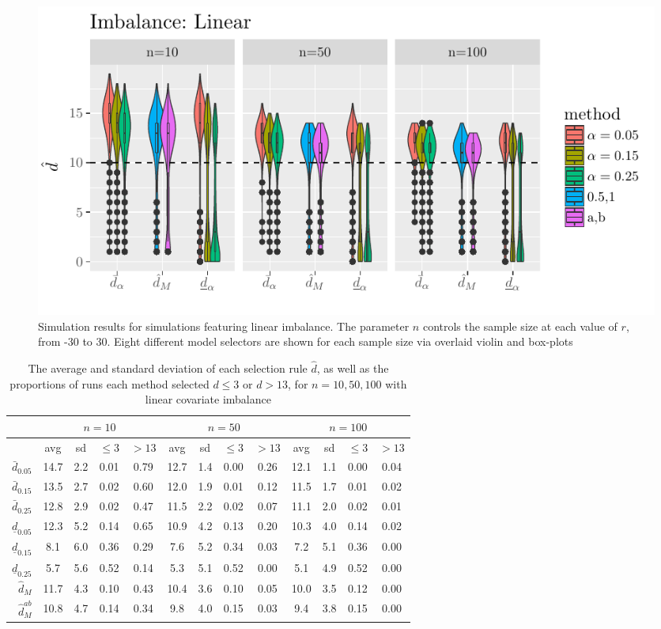 \documentclass[lineno]{biometrika}\usepackage[]{graphicx}\usepackage[]{color}
\makeatletter
\def\maxwidth{ %
  \ifdim\Gin@nat@width>\linewidth
    \linewidth
  \else
    \Gin@nat@width
  \fi
}
\newcommand{\dhatU}{\bar{d}}
\newcommand{\dhatB}{\underline{d}}
\newcommand{\dhatm}{\hat{d}_M}
\newcommand{\dhatmab}{\hat{d}^{ab}_M}
\makeatother
\begin{document}
\begin{figure}

\includegraphics[width=\maxwidth]{figure/linearImbalance-1}

\caption{Simulation results for simulations featuring linear
  imbalance. The parameter $n$ controls the sample size at each value
  of $r$, from -30 to 30. Eight different model selectors are shown
  for each sample size via overlaid violin and box-plots}
\label{fig:linImb}
\end{figure}


\begin{table}[ht]
\centering
\begin{tabular}{r|cccc|cccc|cccc|}
  & \multicolumn{4}{c}{$n=10$}&\multicolumn{4}{c}{$n=50$} &\multicolumn{4}{c}{$n=100$}\\
 \hline
 & avg & sd & $\le 3$ & $>13$ & avg & sd & $\le 3$ & $>13$ & avg & sd & $\le 3$ & $>13$ \\
  \hline
$\dhatU_{0.05}$ & 14.7 & 2.2 & 0.01 & 0.79 & 12.7 & 1.4 & 0.00 & 0.26 & 12.1 & 1.1 & 0.00 & 0.04 \\
  $\dhatU_{0.15}$ & 13.5 & 2.7 & 0.02 & 0.60 & 12.0 & 1.9 & 0.01 & 0.12 & 11.5 & 1.7 & 0.01 & 0.02 \\
  $\dhatU_{0.25}$ & 12.8 & 2.9 & 0.02 & 0.47 & 11.5 & 2.2 & 0.02 & 0.07 & 11.1 & 2.0 & 0.02 & 0.01 \\
  $\dhatB_{0.05}$ & 12.3 & 5.2 & 0.14 & 0.65 & 10.9 & 4.2 & 0.13 & 0.20 & 10.3 & 4.0 & 0.14 & 0.02 \\
  $\dhatB_{0.15}$ & 8.1 & 6.0 & 0.36 & 0.29 & 7.6 & 5.2 & 0.34 & 0.03 & 7.2 & 5.1 & 0.36 & 0.00 \\
  $\dhatB_{0.25}$ & 5.7 & 5.6 & 0.52 & 0.14 & 5.3 & 5.1 & 0.52 & 0.00 & 5.1 & 4.9 & 0.52 & 0.00 \\
  $\dhatm$ & 11.7 & 4.3 & 0.10 & 0.43 & 10.4 & 3.6 & 0.10 & 0.05 & 10.0 & 3.5 & 0.12 & 0.00 \\
  $\dhatmab$ & 10.8 & 4.7 & 0.14 & 0.34 & 9.8 & 4.0 & 0.15 & 0.03 & 9.4 & 3.8 & 0.15 & 0.00 \\
   \hline
\end{tabular}
\caption{The average and standard deviation of each selection rule $\hat{d}$, as well as the proportions of runs each method selected $d\le 3$ or $d>13$, for $n=10,50,100$ with linear covariate imbalance}
\label{tab:linear}
\end{table}
\end{document}
